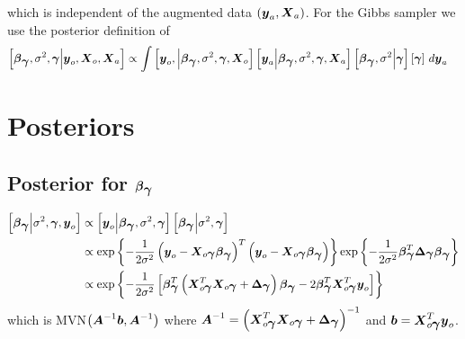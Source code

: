 \documentclass[fleqn]{article}
\def\bm#1{\mbox{\boldmath $#1$}}
\begin{document}
%
which is independent of the augmented data $\left( \bm{y}_a, \bm{X}_a \right)$. For the Gibbs sampler we use the posterior definition of
\begin{align*}
\left[ \bm{\beta}_{\bm{\gamma}}, \sigma^2, \bm{\gamma} \middle| \bm{y}_o, \bm{X}_o, \bm{X}_a \right] & \propto \int \left[ \bm{y}_o, \middle| \bm{\beta}_{\bm{\gamma}}, \sigma^2, \bm{\gamma}, \bm{X}_o \right] \left[ \bm{y}_a \middle| \bm{\beta}_{\bm{\gamma}}, \sigma^2, \bm{\gamma}, \bm{X}_a \right] \left[ \bm{\beta}_{\bm{\gamma}}, \sigma^2 \middle| \bm{\gamma} \right] \left[ \bm{\gamma} \right] \, d \bm{y}_a
\end{align*}
\section{Posteriors}
\subsection{Posterior for $\bm{\beta}_{\bm{\gamma}}$}
%
\begin{align*}
%
\left[ \bm{\beta}_{\bm{\gamma}} \middle| \sigma^2, \bm{\gamma}, \bm{y}_o \right] & \propto \left[ \bm{y}_o \middle| \bm{\beta}_{\bm{\gamma}}, \sigma^2, \bm{\gamma} \right] \left[ \bm{\beta}_{\bm{\gamma}} \middle| \sigma^2, \bm{\gamma} \right] \\
%
& \propto \exp{ \left\{ - \frac{1} {2 \sigma^2} \left( \bm{y}_o - \bm{X}_{o \bm{\gamma}} \bm{\beta}_{\bm{\gamma}} \right)^T \left( \bm{y}_o - \bm{X}_{o \bm{\gamma}} \bm{\beta}_{\bm{\gamma}} \right) \right\} } \exp{ \left\{ - \frac{1} {2 \sigma^2} \bm{\beta}_{\bm{\gamma}}^T \bm{\Delta}_{\bm{\gamma}} \bm{\beta}_{\bm{\gamma}} \right\} } \\
%
& \propto \exp{ \left\{ - \frac{1} {2 \sigma^2} \left[ \bm{\beta}_{\bm{\gamma}}^T \left( \bm{X}_{o \bm{\gamma}}^T \bm{X}_{o \bm{\gamma}} + \bm{\Delta}_{\bm{\gamma}} \right) \bm{\beta}_{\bm{\gamma}} - 2 \bm{\beta}_{\bm{\gamma}}^T \bm{X}_{o \bm{\gamma}}^T \bm{y}_o \right] \right\} }
%
\end{align*}
%
which is MVN$\left( \bm{A}^{ - 1} \bm{b}, \bm{A}^{ - 1} \right)$ where $\bm{A}^{ - 1} = \left( \bm{X}_{o \bm{\gamma}}^T \bm{X}_{o \bm{\gamma}} + \bm{\Delta}_{\bm{\gamma}} \right)^{ - 1}$ and $\bm{b} = \bm{X}_{o \bm{\gamma}}^T \bm{y}_o$.
\end{document}
